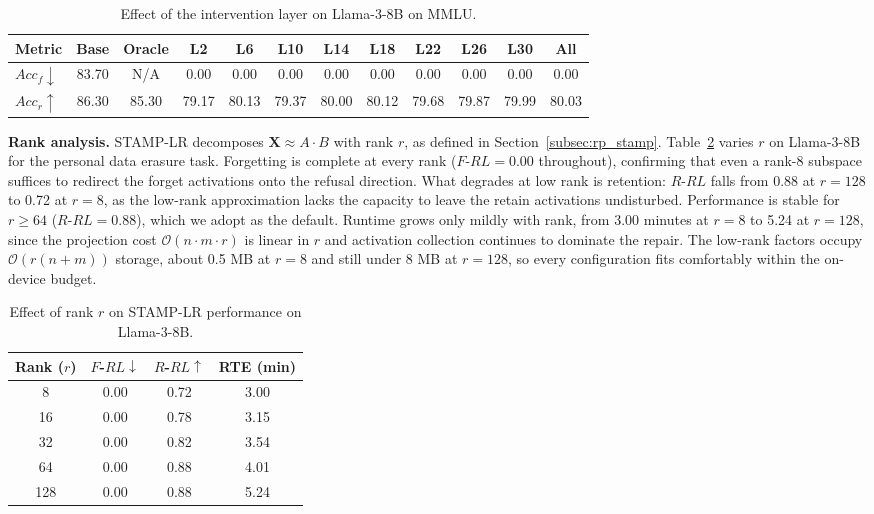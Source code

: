 \begin{table}[htbp]
\centering
\caption{Effect of the intervention layer on Llama-3-8B on MMLU.}
\label{tab:layer_ablation}
\small
\renewcommand{\arraystretch}{1.3}
\setlength{\tabcolsep}{5pt}
\begin{tabular}{lccccccccccc}
\toprule
\textbf{Metric} & \textbf{Base} & \textbf{Oracle} & \textbf{L2} & \textbf{L6} & \textbf{L10} & \textbf{L14} & \textbf{L18} & \textbf{L22} & \textbf{L26} & \textbf{L30} & \textbf{All} \\
\midrule
$Acc_f\!\downarrow$ & 83.70 & N/A & 0.00 & 0.00 & 0.00 & 0.00 & 0.00 & 0.00 & 0.00 & 0.00 & 0.00 \\
\rowcolor{gray!15}
$Acc_r\!\uparrow$ & 86.30 & 85.30 & 79.17 & 80.13 & 79.37 & 80.00 & 80.12 & 79.68 & 79.87 & 79.99 & 80.03 \\
\bottomrule
\end{tabular}
\end{table}

\medskip
\noindent
\textbf{Rank analysis.}
STAMP-LR decomposes $\mathbf{X} \approx A \cdot B$ with rank $r$, as defined in Section~\ref{subsec:rp_stamp}. Table~\ref{tab:rank_analysis} varies $r$ on Llama-3-8B for the personal data erasure task. Forgetting is complete at every rank ($F$-$RL = 0.00$ throughout), confirming that even a rank-8 subspace suffices to redirect the forget activations onto the refusal direction. What degrades at low rank is retention: $R$-$RL$ falls from 0.88 at $r = 128$ to 0.72 at $r = 8$, as the low-rank approximation lacks the capacity to leave the retain activations undisturbed. Performance is stable for $r \geq 64$ ($R$-$RL = 0.88$), which we adopt as the default. Runtime grows only mildly with rank, from 3.00 minutes at $r = 8$ to 5.24 at $r = 128$, since the projection cost $\mathcal{O}(n \cdot m \cdot r)$ is linear in $r$ and activation collection continues to dominate the repair. The low-rank factors occupy $\mathcal{O}(r(n+m))$ storage, about 0.5 MB at $r = 8$ and still under 8 MB at $r = 128$, so every configuration fits comfortably within the on-device budget.


\begin{table}[htbp]
\centering
\caption{Effect of rank $r$ on STAMP-LR performance on Llama-3-8B.}
\label{tab:rank_analysis}
\small
\renewcommand{\arraystretch}{1.3}
\setlength{\tabcolsep}{8pt}
\begin{tabular}{cccc}
\toprule
\textbf{Rank ($r$)} & $F$-$RL\!\downarrow$ & $R$-$RL\!\uparrow$ & \textbf{RTE (min)} \\
\midrule
8   & 0.00 & 0.72 & 3.00 \\
\rowcolor{gray!15}
16  & 0.00 & 0.78 & 3.15 \\
32  & 0.00 & 0.82 & 3.54 \\
\rowcolor{gray!15}
64  & 0.00 & 0.88 & 4.01 \\
128 & 0.00 & 0.88 & 5.24 \\
\bottomrule
\end{tabular}
\end{table}

